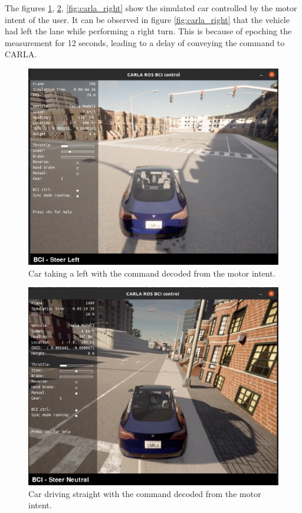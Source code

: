 The figures \ref{fig:carla_left}, \ref{fig:carla_neutral}, \ref{fig:carla_right} show the simulated car controlled by the motor intent of the user. It can be observed in figure \ref{fig:carla_right} that the vehicle had left the lane while performing a right turn. This is because of epoching the measurement for 12 seconds, leading to a delay of conveying the command to CARLA.

     \begin{figure}[H]
        \begin{center}
        \includegraphics[width=1.0\textwidth]{images/carla_left1.png}
        \caption{Car taking a left with the command decoded from the motor intent.}
        \label{fig:carla_left}
        \end{center}
    \end{figure}

     \begin{figure}[H]
        \begin{center}
        \includegraphics[width=1.0\textwidth]{images/carla_neutral1.png}
        \caption{Car driving straight with the command decoded from the motor intent.}
        \label{fig:carla_neutral}
        \end{center}
    \end{figure}

